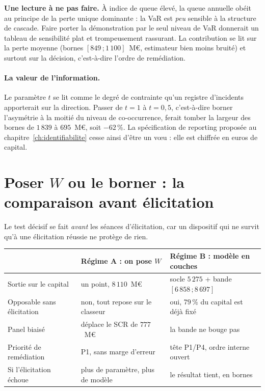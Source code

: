 \begin{attention}
\textbf{Une lecture à ne pas faire.} À indice de queue élevé, la queue annuelle obéit au
principe de la perte unique dominante : la VaR est \emph{peu} sensible à la structure de
cascade. Faire porter la démonstration par le seul niveau de VaR donnerait un tableau de
sensibilité plat et trompeusement rassurant. La contribution se lit sur la perte
moyenne (bornes $[849\,;1\,100]$~M\euro{}, estimateur bien moins bruité) et surtout sur
la décision, c'est-à-dire l'ordre de remédiation.
\end{attention}

\paragraph{La valeur de l'information.} Le paramètre $t$ se lit comme le degré de
contrainte qu'un registre d'incidents apporterait sur la direction. Passer de $t=1$ à
$t=0{,}5$, c'est-à-dire borner l'asymétrie à la moitié du niveau de co-occurrence, ferait
tomber la largeur des bornes de $1\,839$ à $695$~M\euro{}, soit $-62\,\%$. La
spécification de reporting proposée au chapitre~\ref{ch:identifiabilite} cesse ainsi
d'être un v\oe{}u : elle est chiffrée en euros de capital.


\section{Poser \texorpdfstring{$W$}{W} ou le borner : la comparaison avant élicitation}

Le test décisif se fait \emph{avant} les séances d'élicitation, car un dispositif qui ne
survit qu'à une élicitation réussie ne protège de rien.

\begin{center}\footnotesize
\renewcommand{\arraystretch}{1.3}
\begin{tabular}{@{}p{4.1cm} p{4.5cm} p{5.6cm}@{}}
\toprule
 & \textbf{Régime A : on pose $W$} & \textbf{Régime B : modèle en couches} \\
\midrule
Sortie sur le capital & un point, $8\,110$~M\euro{} & socle $5\,275$ + bande $[6\,858\,;8\,697]$ \\
Opposable sans élicitation & non, tout repose sur le classeur & oui, $79\,\%$ du capital est déjà fixé \\
Panel biaisé & déplace le SCR de $777$~M\euro{} & la bande ne bouge pas \\
Priorité de remédiation & P1, sans marge d'erreur & tête P1/P4, ordre interne ouvert \\
Si l'élicitation échoue & plus de paramètre, plus de modèle & le résultat tient, en bornes \\
\bottomrule
\end{tabular}
\end{center}

